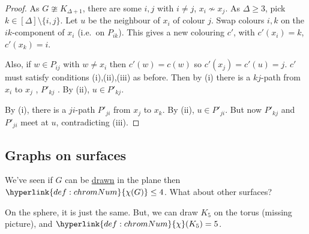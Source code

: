 \documentclass{article}
\begin{document}
\begin{proof}
    As $G \ncong K_{\Delta+1}$, there are some $i, j$ with $i \neq j$, $x_i \nsim x_j$.
    As $\Delta \geq 3$, pick $k \in [\Delta] \setminus \{i, j\}$.
    Let $u$ be the neighbour of $x_i$ of colour $j$.
    Swap colours $i,k$ on the $ik$-component of $x_i$ (i.e.\ on $P_{ik}$).
    This gives a new colouring $c'$, with $c'(x_i) = k$, $c'(x_k) = i$.

    Also, if $w \in P_{ij}$ with $w \neq x_i$ then $c'(w) = c(w)$ so $c'(x_j)=c'(u) = j$.
    $c'$ must satisfy conditions (i),(ii),(iii) as before.
    Then by (i) there is a $kj$-path from $x_i$ to $x_j$ , $P'_{kj}$ .
    By (ii), $u \in P'_{kj}$.

    By (i), there is a $ji$-path $P'_{ji}$ from $x_j$ to $x_k$.
    By (ii), $u \in P'_{ji}$.
    But now $P'_{kj}$ and $P'_{ji}$ meet at $u$, contradicting (iii).
\end{proof}

\subsection{Graphs on surfaces}
We've seen if $G$ can be \hyperlink{def:drawing}{drawn} in the plane then $\hyperlink{def:chromNum}{\chi(G)} \leq 4$.
What about other surfaces?

On the sphere, it is just the same.
But, we can draw \hyperlink{def:Kn}{$K_5$} on the torus (missing picture), and $\hyperlink{def:chromNum}{\chi}(K_5) = 5$.
\end{document}
